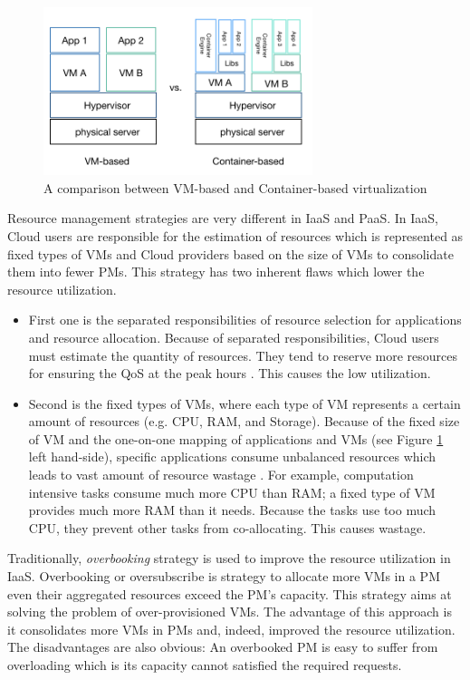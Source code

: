 \vspace{10mm}
\begin{figure}
	\centering
	\includegraphics[width=0.7\textwidth]{pics/comparison.png}
	\caption{A comparison between VM-based and Container-based virtualization}
	\label{fig:comparison}
\end{figure}

Resource management strategies are very different in IaaS and PaaS. In IaaS, Cloud users are responsible for the estimation of resources which is represented as fixed types of VMs and Cloud providers based on the size of VMs to consolidate them into fewer PMs. This strategy has two inherent flaws which lower the resource utilization.

\begin{itemize}
	\item First one is the separated responsibilities of resource selection for applications and resource allocation. Because of separated responsibilities, Cloud users must estimate the quantity of resources. They tend to reserve more resources for ensuring the QoS at the peak hours \cite{Chaisiri:2012cv}. This causes the low utilization.
	\item Second is the fixed types of VMs, where each type of VM represents a certain amount of resources (e.g. CPU, RAM, and Storage). Because of the fixed size of VM and the one-on-one mapping of applications and VMs (see Figure \ref{fig:comparison} left hand-side), specific applications consume unbalanced resources which leads to vast amount of resource wastage \cite{Tomas:2013iv}. For example, computation intensive tasks consume much more CPU than RAM; a fixed type of VM provides much more RAM than it needs. Because the tasks use too much CPU, they prevent other tasks from co-allocating. This causes wastage.
\end{itemize}

Traditionally, \emph{overbooking} strategy is used to improve the resource utilization in IaaS. 
Overbooking \cite{Tomas:2013iv} or oversubscribe is strategy to allocate more VMs in a PM even their aggregated resources exceed the PM's capacity. This strategy aims at solving the problem of over-provisioned VMs. The advantage of this approach is it consolidates more VMs in PMs and, indeed, improved the resource utilization. The disadvantages are also obvious: An overbooked PM is easy to suffer from overloading which is its capacity cannot satisfied the required requests. 



